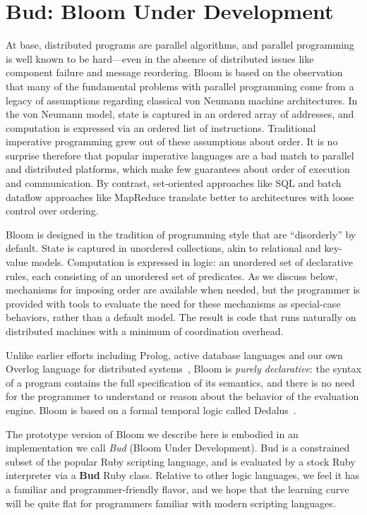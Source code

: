 \section{Bud: Bloom Under Development}
\label{sec:lang}
At base, distributed programs are parallel algorithms, and parallel programming is well known to be hard---even in the absence of distributed issues like component failure and message reordering.  Bloom is based on the observation that many of the fundamental problems with parallel programming come from a legacy of assumptions regarding classical von Neumann machine architectures.  In the von Neumann model, state is captured in an ordered array of addresses, and computation is expressed via an ordered list of instructions.  Traditional imperative programming grew out of these assumptions about order.  It is no surprise therefore that popular imperative languages are a bad match to parallel and distributed platforms, which make few guarantees about order of execution and communication. By contrast, set-oriented approaches like SQL and batch dataflow approaches like MapReduce translate better to architectures with loose control over ordering.

Bloom is designed in the tradition of programming style that are ``disorderly'' by default.  State is captured in unordered collections, akin to relational and key-value models.  Computation is expressed in logic: an unordered set of declarative rules, each consisting of an unordered set of predicates.  As we discuss below, mechanisms for imposing order are available when needed, but the programmer is provided with tools to evaluate the need for these mechanisms as special-case behaviors, rather than a default model.  The result is code that runs naturally on distributed machines with a minimum of coordination overhead.
 
Unlike earlier efforts including Prolog, active database languages%
and our own Overlog language for distributed systems~\cite{p2}, Bloom is {\em purely declarative}: the syntax of a program contains the full specification of its semantics, and there is no need for the programmer to understand or reason about the behavior of the evaluation engine.  Bloom is based on a formal temporal logic called Dedalus~\cite{dedalus-techr}.

The prototype version of Bloom we describe here is embodied in an implementation we call {\em Bud} (Bloom Under Development).  Bud is a constrained subset of the popular Ruby scripting language, and is evaluated by a stock Ruby interpreter via a \textbf{Bud} Ruby class.  Relative to other logic languages, we feel it has a familiar and programmer-friendly flavor, and we hope that the learning curve will be quite flat for programmers familiar with modern scripting languages.

